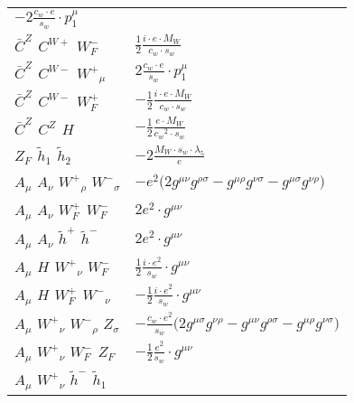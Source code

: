 \begin{center}
\begin{tabular}{|l|l|}
	$-2\frac{ c_w \cdot e}{ s_w}\cdot p_1^\mu $\\[2mm]
$\bar{C}^{Z}{}_{}$ \phantom{-} $C^{W+}{}_{}$ \phantom{-} $W^-_F{}_{}$ \phantom{-}  &
	$\frac{1}{2}\frac{ i \cdot e \cdot M_W}{ c_w \cdot s_w}$\\[2mm]
$\bar{C}^{Z}{}_{}$ \phantom{-} $C^{W-}{}_{}$ \phantom{-} $W^+{}_{\mu }$ \phantom{-}  &
	$2\frac{ c_w \cdot e}{ s_w}\cdot p_1^\mu $\\[2mm]
$\bar{C}^{Z}{}_{}$ \phantom{-} $C^{W-}{}_{}$ \phantom{-} $W^+_F{}_{}$ \phantom{-}  &
	$-\frac{1}{2}\frac{ i \cdot e \cdot M_W}{ c_w \cdot s_w}$\\[2mm]
$\bar{C}^{Z}{}_{}$ \phantom{-} $C^{Z}{}_{}$ \phantom{-} ${H}_{}$ \phantom{-}  &
	$-\frac{1}{2}\frac{ e \cdot M_W}{ c_w{}^2  \cdot s_w}$\\[2mm]
$Z_F{}_{}$ \phantom{-} $\widetilde{h}_1{}_{}$ \phantom{-} $\widetilde{h}_2{}_{}$ \phantom{-}  &
	$-2\frac{ M_W \cdot s_w \cdot \lambda_5}{ e}$\\[2mm]
${A}_{\mu }$ \phantom{-} ${A}_{\nu }$ \phantom{-} $W^+{}_{\rho }$ \phantom{-} $W^-{}_{\sigma }$ \phantom{-}  &
	$- e{}^2 \big(2g^{\mu \nu} g^{\rho \sigma} -g^{\mu \rho} g^{\nu \sigma} -g^{\mu \sigma} g^{\nu \rho} \big)$\\[2mm]
${A}_{\mu }$ \phantom{-} ${A}_{\nu }$ \phantom{-} $W^+_F{}_{}$ \phantom{-} $W^-_F{}_{}$ \phantom{-}  &
	$2 e{}^2 \cdot g^{\mu \nu} $\\[2mm]
${A}_{\mu }$ \phantom{-} ${A}_{\nu }$ \phantom{-} $\widetilde{h}^+{}_{}$ \phantom{-} $\widetilde{h}^-{}_{}$ \phantom{-}  &
	$2 e{}^2 \cdot g^{\mu \nu} $\\[2mm]
${A}_{\mu }$ \phantom{-} ${H}_{}$ \phantom{-} $W^+{}_{\nu }$ \phantom{-} $W^-_F{}_{}$ \phantom{-}  &
	$\frac{1}{2}\frac{ i \cdot e{}^2 }{ s_w}\cdot g^{\mu \nu} $\\[2mm]
${A}_{\mu }$ \phantom{-} ${H}_{}$ \phantom{-} $W^+_F{}_{}$ \phantom{-} $W^-{}_{\nu }$ \phantom{-}  &
	$-\frac{1}{2}\frac{ i \cdot e{}^2 }{ s_w}\cdot g^{\mu \nu} $\\[2mm]
${A}_{\mu }$ \phantom{-} $W^+{}_{\nu }$ \phantom{-} $W^-{}_{\rho }$ \phantom{-} ${Z}_{\sigma }$ \phantom{-}  &
	$-\frac{ c_w \cdot e{}^2 }{ s_w}\big(2g^{\mu \sigma} g^{\nu \rho} -g^{\mu \nu} g^{\rho \sigma} -g^{\mu \rho} g^{\nu \sigma} \big)$\\[2mm]
${A}_{\mu }$ \phantom{-} $W^+{}_{\nu }$ \phantom{-} $W^-_F{}_{}$ \phantom{-} $Z_F{}_{}$ \phantom{-}  &
	$-\frac{1}{2}\frac{ e{}^2 }{ s_w}\cdot g^{\mu \nu} $\\[2mm]
${A}_{\mu }$ \phantom{-} $W^+{}_{\nu }$ \phantom{-} $\widetilde{h}^-{}_{}$ \phantom{-} $\widetilde{h}_1{}_{}$ \phantom{-}  &

\end{tabular}
\end{center}
